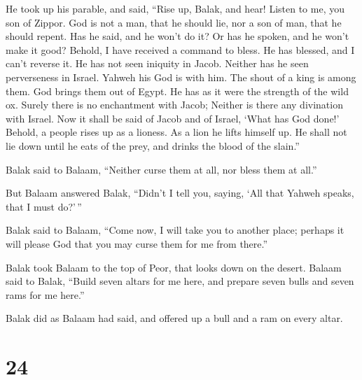  He took up his parable, and said, ``Rise up, Balak, and
hear! Listen to me, you son of Zippor.  God is not a man,
that he should lie, nor a son of man, that he should repent. Has he
said, and he won't do it? Or has he spoken, and he won't make it good?
 Behold, I have received a command to bless. He has
blessed, and I can't reverse it.  He has not seen iniquity
in Jacob. Neither has he seen perverseness in Israel. Yahweh his God is
with him. The shout of a king is among them.  God brings
them out of Egypt. He has as it were the strength of the wild ox.
 Surely there is no enchantment with Jacob; Neither is
there any divination with Israel. Now it shall be said of Jacob and of
Israel, `What has God done!'  Behold, a people rises up as
a lioness. As a lion he lifts himself up. He shall not lie down until he
eats of the prey, and drinks the blood of the slain.''

 Balak said to Balaam, ``Neither curse them at all, nor
bless them at all.''

 But Balaam answered Balak, ``Didn't I tell you, saying,
`All that Yahweh speaks, that I must do?'\,''

 Balak said to Balaam, ``Come now, I will take you to
another place; perhaps it will please God that you may curse them for me
from there.''

 Balak took Balaam to the top of Peor, that looks down on
the desert.  Balaam said to Balak, ``Build seven altars for
me here, and prepare seven bulls and seven rams for me here.''

 Balak did as Balaam had said, and offered up a bull and a
ram on every altar.

\hypertarget{section-23}{%
\section{24}\label{section-23}}

